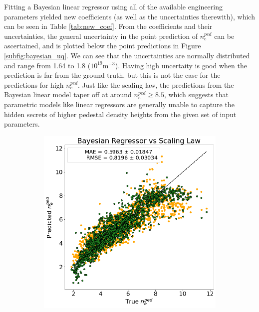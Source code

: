 \documentclass[a4paper, twoside, final, 12pt]{article}
\begin{document}
{Fitting a Bayesian linear regressor using all of the available engineering parameters yielded new coefficients (as well as the uncertainties therewith), which can be seen in Table \ref{tab:new_coef}. 
From the coefficients and their uncertainties, the general uncertainty in the point prediction of $n_e^{ped}$ can be ascertained, and is plotted below the point predictions in Figure \ref{subfig:bayesian_uq}.
We can see that the uncertainties are normally distributed and range from 1.64 to 1.8 ($10^{19}\text{m}^{-3}$). Having high uncertaity is good when the prediction is far from the ground truth, but this is not the case for the predictions for high $n_e^{ped}$. 
Just like the scaling law, the predictions from the Bayesian linear model taper off at around $n_e^{ped} \geq 8.5$, which suggests that parametric models like linear regressors are generally unable to capture the hidden secrets of higher pedestal density heights from the given set of input parameters.
\begin{figure}
	\centering
	\begin{subfigure}{0.495\linewidth}
		\centering
		\includegraphics[scale=0.35]{./src/Baysian_regression_predictions}
		\caption{}
		\label{subfig:baysian_results}
	\end{subfigure}
	\begin{subfigure}{0.495\linewidth}
		\centering

\end{subfigure}
\end{figure}}
\end{document}
